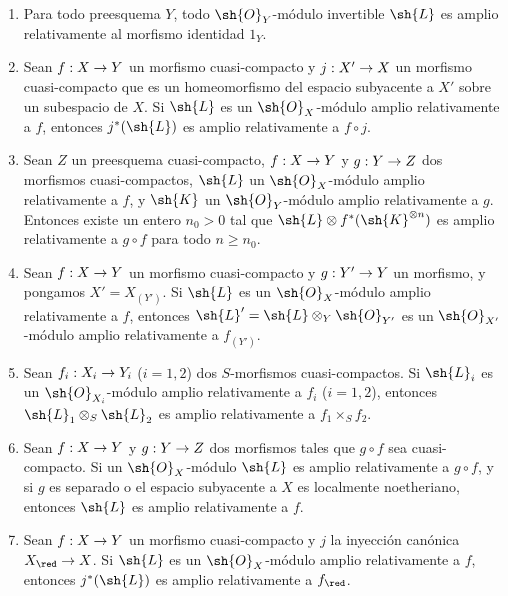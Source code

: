 \documentclass[oneside,10pt]{amsart}
\makeatletter
\renewcommand{\geq}{\geqslant}
\newcommand{\ega@arrow}[2]{\mathchoice{#1}{#2}{#2}{#2}}
\renewcommand{\to}{\ega@arrow{\longrightarrow}{\rightarrow}}
\newcommand{\oldpage}[2][]{\marginnote{\normalfont\footnotesize\textbf{#1}~|~#2}\ignorespaces}
\let\EGAOriginalLabel\label
\renewcommand{\label}[1]{\phantomsection\EGAOriginalLabel{#1}}
\makeatother
\begin{document}
\begin{proposition}[4.6.13]
\label{II.4.6.13}
\begin{enumerate}
  \item[\rm{(i)}] Para todo preesquema $Y$, todo $\sh{O}_Y$-módulo invertible $\sh{L}$ es amplio relativamente al morfismo identidad $1_Y$.
  \item[\rm{(i \emph{bis})}] Sean $f:X\to Y$ un morfismo cuasi-compacto y $j:X'\to X$ un morfismo cuasi-compacto que es un homeomorfismo del espacio subyacente a $X'$ sobre un subespacio de $X$.
    Si $\sh{L}$ es un $\sh{O}_X$-módulo amplio relativamente a $f$, entonces $j^*(\sh{L})$ es amplio relativamente a $f\circ j$.
  \item[\rm{(ii)}] Sean $Z$ un preesquema cuasi-compacto, $f:X\to Y$ y $g:Y\to Z$ dos morfismos cuasi-compactos, $\sh{L}$ un $\sh{O}_X$-módulo amplio relativamente a $f$, y $\sh{K}$ un $\sh{O}_Y$-módulo amplio relativamente a $g$.
    Entonces existe un entero $n_0>0$ tal que $\sh{L}\otimes f^*(\sh{K}^{\otimes n})$ es amplio relativamente a $g\circ f$ para todo $n\geq n_0$.
  \item[\rm{(iii)}] Sean $f:X\to Y$ un morfismo cuasi-compacto y $g:Y'\to Y$ un morfismo, y pongamos $X'=X_{(Y')}$.
    Si $\sh{L}$ es un $\sh{O}_X$-módulo amplio relativamente a $f$, entonces $\sh{L}'=\sh{L}\otimes_Y\sh{O}_{Y'}$ es un $\sh{O}_{X'}$-módulo amplio relativamente a $f_{(Y')}$.
  \item[\rm{(iv)}] Sean $f_i:X_i\to Y_i$ ($i=1,2$) dos $S$-morfismos cuasi-compactos.
    Si $\sh{L}_i$ es un $\sh{O}_{X_i}$-módulo amplio relativamente a $f_i$ ($i=1,2$), entonces $\sh{L}_1\otimes_S\sh{L}_2$ es amplio relativamente a $f_1\times_S f_2$.
  \item[\rm{(v)}] Sean $f:X\to Y$ y $g:Y\to Z$ dos morfismos tales que $g\circ f$ sea cuasi-compacto.
    Si un
\oldpage[II]{92}
    $\sh{O}_X$-módulo $\sh{L}$ es amplio relativamente a $g\circ f$, y si $g$ es separado o el espacio subyacente a $X$ es localmente noetheriano, entonces $\sh{L}$ es amplio relativamente a $f$.
  \item[\rm{(vi)}] Sean $f:X\to Y$ un morfismo cuasi-compacto y $j$ la inyección canónica $X_\red\to X$.
    Si $\sh{L}$ es un $\sh{O}_X$-módulo amplio relativamente a $f$, entonces $j^*(\sh{L})$ es amplio relativamente a $f_\red$.
\end{enumerate}
\end{proposition}
\end{document}
